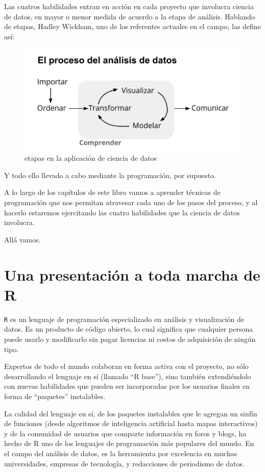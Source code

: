 \documentclass[]{book}
\begin{document}
Las cuatros habilidades entran en acción en cada proyecto que involucra
ciencia de datos, en mayor o menor medida de acuerdo a la etapa de
análisis. Hablando de etapas, Hadley Wickham, uno de los referentes
actuales en el campo, las define así:

\begin{figure}
\includegraphics[width=6.28in]{imagenes/proceso_ciencia_datos} \caption{etapas en la aplicación de ciencia de datos}\label{fig:unnamed-chunk-4}
\end{figure}

Y todo ello llevado a cabo mediante la programación, por supuesto.

A lo largo de los capítulos de este libro vamos a aprender técnicas de
programación que nos permitan atravesar cada uno de los pasos del
proceso, y al hacerlo estaremos ejercitando las cuatro habilidades que
la ciencia de datos involucra.

Allá vamos.

\chapter{Una presentación a toda marcha de
R}\label{una-presentacion-a-toda-marcha-de-r}

\texttt{R} es un lenguaje de programación especializado en análisis y
visualización de datos. Es un producto de código abierto, lo cual
significa que cualquier persona puede usarlo y modificarlo sin pagar
licencias ni costos de adquisición de ningún tipo.

Expertos de todo el mundo colaboran en forma activa con el proyecto, no
sólo desarrollando el lenguaje en sí (llamado ``R base''), sino también
extendiéndolo con nuevas habilidades que pueden ser incorporadas por los
usuarios finales en forma de ``paquetes'' instalables.

La calidad del lenguaje en sí, de los paquetes instalables que le
agregan un sinfín de funciones (desde algoritmos de inteligencia
artificial hasta mapas interactivos) y de la comunidad de usuarios que
comparte información en foros y blogs, ha hecho de R uno de los
lenguajes de programación más populares del mundo. En el campo del
análisis de datos, es la herramienta por excelencia en muchas
universidades, empresas de tecnología, y redacciones de periodismo de
datos.
\end{document}
